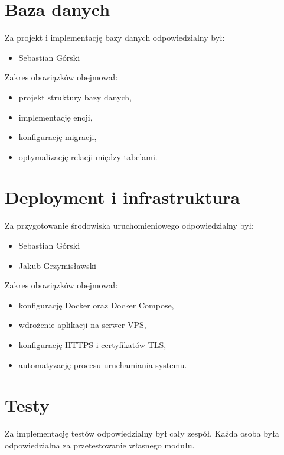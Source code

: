 \section{Baza danych}

Za projekt i implementację bazy danych odpowiedzialny był:
\begin{itemize}
	\item Sebastian Górski
\end{itemize}

Zakres obowiązków obejmował:
\begin{itemize}
	\item projekt struktury bazy danych,
	\item implementację encji,
	\item konfigurację migracji,
	\item optymalizację relacji między tabelami.
\end{itemize}

\section{Deployment i infrastruktura}

Za przygotowanie środowiska uruchomieniowego odpowiedzialny był:
\begin{itemize}
	\item Sebastian Górski
	\item Jakub Grzymisławski
\end{itemize}

Zakres obowiązków obejmował:
\begin{itemize}
	\item konfigurację Docker oraz Docker Compose,
	\item wdrożenie aplikacji na serwer VPS,
	\item konfigurację HTTPS i certyfikatów TLS,
	\item automatyzację procesu uruchamiania systemu.
\end{itemize}

\section{Testy}

Za implementację testów odpowiedzialny był cały zespół. Każda osoba była odpowiedzialna za przetestowanie własnego modułu.